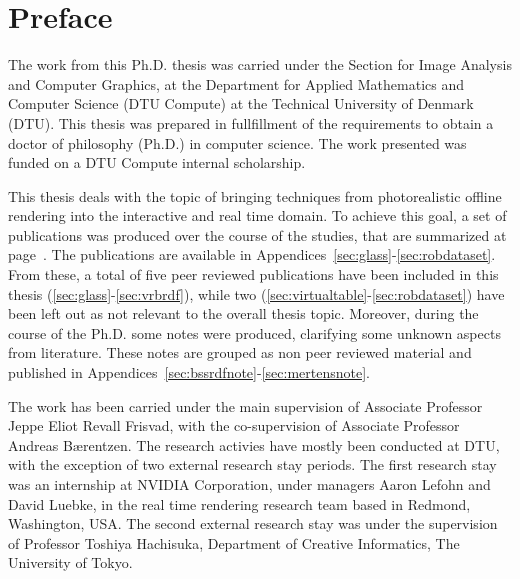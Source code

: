 \chapter{Preface}

The work from this Ph.D. thesis was carried under the Section for Image Analysis and Computer Graphics, at the Department for Applied Mathematics and Computer Science (DTU Compute) at the Technical University of Denmark (DTU). This thesis was prepared in fullfillment of the requirements to obtain a doctor of philosophy (Ph.D.) in computer science. The work presented was funded on a DTU Compute internal scholarship. 

This thesis deals with the topic of bringing techniques from photorealistic offline rendering into the interactive and real time domain. To achieve this goal, a set of publications was produced over the course of the studies, that are summarized at page~\pageref{sec:contributionlist}. The publications are available in Appendices~\ref{sec:glass}-\ref{sec:robdataset}. From these, a total of five peer reviewed publications have been included in this thesis (\ref{sec:glass}-\ref{sec:vrbrdf}), while two (\ref{sec:virtualtable}-\ref{sec:robdataset}) have been left out as not relevant to the overall thesis topic. Moreover, during the course of the Ph.D. some notes were produced, clarifying some unknown aspects from literature. These notes are grouped as non peer reviewed material and published in Appendices~\ref{sec:bssrdfnote}-\ref{sec:mertensnote}. 

The work has been carried under the main supervision of Associate Professor Jeppe Eliot Revall Frisvad, with the co-supervision of Associate Professor Andreas B\ae rentzen. The research activies have mostly been conducted at DTU, with the exception of two external research stay periods. The first research stay was an internship at NVIDIA Corporation, under managers Aaron Lefohn and David Luebke, in the real time rendering research team based in Redmond, Washington, USA. The second external research stay was under the supervision of Professor Toshiya Hachisuka, Department of Creative Informatics, The University of Tokyo.

